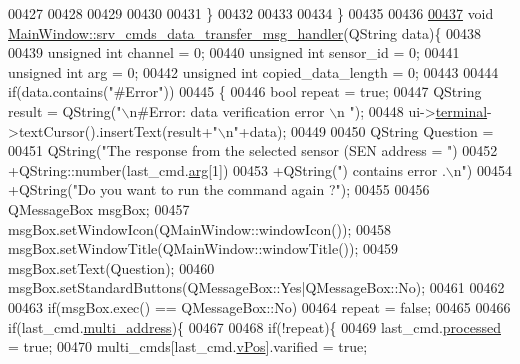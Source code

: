 \begin{DoxyCode}
{{{{{{{{{{{{{{{{00427 
00428 
00429 
00430 
00431      \}
00432 
00433 
00434 \}
00435 
00436 
\hypertarget{a00049_source_l00437}{}\hyperlink{a00006_ae19ec21c1009c81700a8ad2e1f81be07}{00437} \textcolor{keywordtype}{void} \hyperlink{a00006_ae19ec21c1009c81700a8ad2e1f81be07}{MainWindow::srv\_cmds\_data\_transfer\_msg\_handler}(QString 
      data)\{
00438 
00439     \textcolor{keywordtype}{unsigned} \textcolor{keywordtype}{int}  channel               = 0;
00440     \textcolor{keywordtype}{unsigned} \textcolor{keywordtype}{int}  sensor\_id             = 0;
00441     \textcolor{keywordtype}{unsigned} \textcolor{keywordtype}{int}  arg                   = 0;
00442     \textcolor{keywordtype}{unsigned} \textcolor{keywordtype}{int}  copied\_data\_length    = 0;
00443 
00444         \textcolor{keywordflow}{if}(data.contains(\textcolor{stringliteral}{"#Error"}))
00445         \{
00446              \textcolor{keywordtype}{bool} repeat = \textcolor{keyword}{true};
00447              QString result =  QString(\textcolor{stringliteral}{"\(\backslash\)n#Error: data verification error \(\backslash\)n "});
00448              ui->\hyperlink{a00027_aae71c46ea4546df5994735dee573b2dd}{terminal}->textCursor().insertText(result+\textcolor{stringliteral}{"\(\backslash\)n"}+data);
00449 
00450              QString Question =
00451                      QString(\textcolor{stringliteral}{"The response from the selected sensor (SEN address = "})
00452                      +QString::number(last\_cmd.\hyperlink{a00001_a56e6c2d7315d0ae60a51e8b140c9cfe4}{arg}[1])
00453                      +QString(\textcolor{stringliteral}{") contains error .\(\backslash\)n"})
00454                      +QString(\textcolor{stringliteral}{"Do you want to run the command again ?"});
00455 
00456              QMessageBox msgBox;
00457              msgBox.setWindowIcon(QMainWindow::windowIcon());
00458              msgBox.setWindowTitle(QMainWindow::windowTitle());
00459              msgBox.setText(Question);
00460              msgBox.setStandardButtons(QMessageBox::Yes|QMessageBox::No);
00461 
00462 
00463              \textcolor{keywordflow}{if}(msgBox.exec() == QMessageBox::No)
00464                       repeat = \textcolor{keyword}{false};
00465 
00466                  \textcolor{keywordflow}{if}(last\_cmd.\hyperlink{a00001_a8e69b971c61ced27a7567efd2bf0db59}{multi\_address})\{
00467 
00468                      \textcolor{keywordflow}{if}(!repeat)\{
00469                      last\_cmd.\hyperlink{a00001_a3e88f779da9798a5da7dda227e2ca388}{processed} = \textcolor{keyword}{true};
00470                      multi\_cmds[last\_cmd.\hyperlink{a00001_a2b48b371fd84be2a8ad581b1ad708b88}{vPos}].varified = \textcolor{keyword}{true};
}}}}}}}}}}}}}}}}
\end{DoxyCode}
